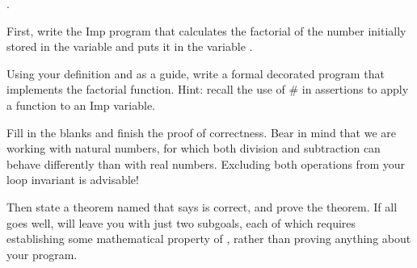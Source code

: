 \documentclass[12pt]{report}
\begin{document}
\begin{coqdoccode}
\coqdocemptyline
\coqdocnoindent
{}  . \coqdocemptyline
\end{coqdoccode}
First, write the Imp program  that calculates the factorial
    of the number initially stored in the variable  and puts it in
    the variable . 

 Using your definition  and  as a
    guide, write a formal decorated program  that
    implements the factorial function.  Hint: recall the use of \#
    in assertions to apply a function to an Imp variable.


    Fill in the blanks and finish the proof of correctness. Bear in mind
    that we are working with natural numbers, for which both division
    and subtraction can behave differently than with real numbers.
    Excluding both operations from your loop invariant is advisable!


    Then state a theorem named  that says
     is correct, and prove the theorem.  If all goes
    well,  will leave you with just two subgoals, each of
    which requires establishing some mathematical property of ,
    rather than proving anything about your program.
\end{document}
